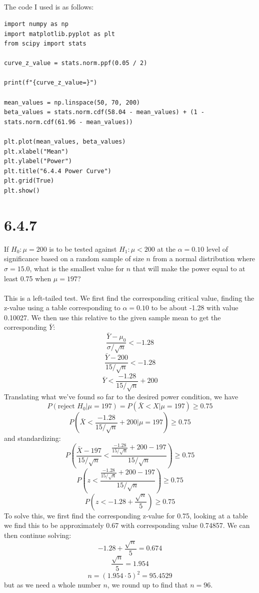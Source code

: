 \documentclass{article}
\begin{document}
{\\ \\ \\ \\ \\ \\ \\ \\ \\ \\ \\ \\ \\ \\
The code I used is as follows:
\begin{verbatim}
import numpy as np
import matplotlib.pyplot as plt
from scipy import stats

curve_z_value = stats.norm.ppf(0.05 / 2)

print(f"{curve_z_value=}")

mean_values = np.linspace(50, 70, 200)
beta_values = stats.norm.cdf(58.04 - mean_values) + (1 - stats.norm.cdf(61.96 - mean_values))

plt.plot(mean_values, beta_values)
plt.xlabel("Mean")
plt.ylabel("Power")
plt.title("6.4.4 Power Curve")
plt.grid(True)
plt.show()
\end{verbatim}

\section*{6.4.7} 

If \(H_0: \mu = 200\) is to be tested against \(H_1: \mu < 200\) at the \( \alpha = 0.10\) level of significance based on a random sample of size \(n\) from a normal distribution where \(\sigma = 15.0\), what is the smallest value for \(n\) that will make the power equal to at least 0.75 when \(\mu = 197\)?
\\
\\
This is a left-tailed test. We first find the corresponding critical value, finding the z-value using a table corresponding to \(\alpha = 0.10\) to be about -1.28 with value 0.10027. We then use this relative to the given sample mean to get the corresponding \(\bar{Y}\):
\[
\frac{\bar{Y} - \mu_0}{\sigma / \sqrt{n}} < -1.28
\]
\[
\frac{\bar{Y} - 200}{15 / \sqrt{n}} < -1.28
\]
\[
\bar{Y} < \frac{-1.28}{15 / \sqrt{n}} + 200
\]
Translating what we've found so far to the desired power condition,  we have
\[
P(\text{reject }H_0 | \mu = 197) = P(\bar{X} < X | \mu = 197) \geq 0.75
\]
\[
P(\bar{X} < \frac{-1.28}{15 / \sqrt{n}} + 200 | \mu = 197) \geq 0.75
\]
and standardizing:
\[
P(\frac{\bar{X} - 197}{15 / \sqrt{n}} < \frac{\frac{-1.28}{15 / \sqrt{n}} + 200 - 197}{15 / \sqrt{n}}) \geq 0.75
\]
\[
P(z < \frac{\frac{-1.28}{15 / \sqrt{n}} + 200 - 197}{15 / \sqrt{n}}) \geq 0.75
\]
\[
P(z < -1.28 + \frac{\sqrt{n}}{5}) \geq 0.75
\]
To solve this, we first find the corresponding z-value for 0.75, looking at a table we find this to be approximately 0.67 with corresponding value 0.74857. We can then continue solving:
\[
-1.28 + \frac{\sqrt{n}}{5} = 0.674
\]
\[
\frac{\sqrt{n}}{5} = 1.954
\]
\[
n = (1.954 \cdot 5)^2 = 95.4529
\]
but as we need a whole number \(n\), we round up to find that \(n = 96\).

}
\end{document}
